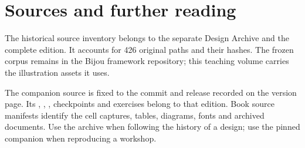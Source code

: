 \clearpage
\setcounter{chapter}{0}
\renewcommand{\thechapter}{P\arabic{chapter}}
\renewcommand{\theHchapter}{provenance.\arabic{chapter}}
\chapter{Sources and further reading}

The historical source inventory belongs to the separate Design Archive and the complete edition. It accounts for 426 original paths and their hashes. The frozen corpus remains in the Bijou framework repository; this teaching volume carries the illustration assets it uses.

The companion source is fixed to the commit and release recorded on the version page. Its , , , checkpoints and exercises belong to that edition. Book source manifests identify the cell captures, tables, diagrams, fonts and archived documents. Use the archive when following the history of a design; use the pinned companion when reproducing a workshop.
